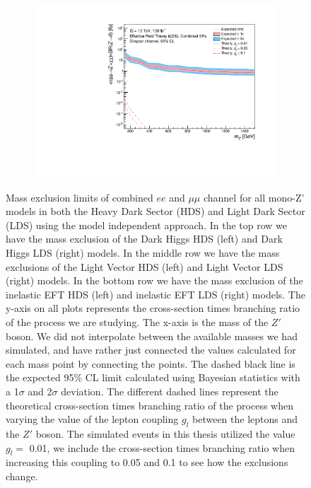 \documentclass[12pt, a4paper]{book}
\begin{document}
\begin{figure}[!ht]
\begin{subfigure}[b]{0.49\textwidth}
   \end{subfigure}
   \hfill
   \begin{subfigure}[b]{0.49\textwidth}
      \centering
      \includegraphics[width=1\textwidth]{Limits/Model_independent/EFT_LDS/mass_exclusion_comb.pdf}
   \end{subfigure}
   \caption[Mass exclusion limits of combined $ee$ and $\mu\mu$ channel for all mono-Z' models using the model independent approach]{Mass exclusion limits of combined $ee$ and $\mu\mu$ channel for all mono-Z' models in both the Heavy Dark Sector (HDS) and Light Dark Sector (LDS) using the model independent approach. 
   In the top row we have the mass exclusion of the Dark Higgs HDS (left) and Dark Higgs LDS (right) models. In the middle row we have the mass exclusions of the Light Vector HDS (left) and Light Vector LDS (right) models. In the bottom row we have the mass exclusion of the 
   inelastic EFT HDS (left) and inelastic EFT LDS (right) models.
   The y-axis on all plots represents the cross-section times branching ratio of the process we are studying. The x-axis is the mass of the $Z'$ boson. We did not interpolate between the available masses we had simulated, 
   and have rather just connected the values calculated for each mass point by connecting the points. The dashed black line is the expected 95\% CL limit calculated using Bayesian statistics with a 1$\sigma$ and 2$\sigma$ deviation. 
   The different dashed lines represent the theoretical cross-section times branching ratio of the process when varying the value of the lepton coupling $g_l$ between the leptons and the $Z'$ boson. The simulated events in this thesis utilized the value $g_l=$ 0.01, we include the cross-section times branching ratio when increasing this coupling to 0.05 and 0.1 to see how the exclusions change. 
   }\label{fig:model_indep_mono_Zp_excl}
\end{figure}
\end{document}
